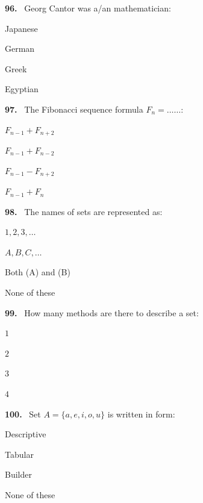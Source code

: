 \documentclass[11pt]{article}
\newenvironment{qenv}[1]{%
  \par\medskip\noindent\textbf{#1.}\ \ignorespaces
}{\par}
\begin{document}
\begin{qenv}{96} Georg Cantor was a/an \underline{\hspace{2cm}} mathematician:
\begin{options} \item Japanese \item German \item Greek \item Egyptian \end{options} \end{qenv}

\begin{qenv}{97} The Fibonacci sequence formula $F_n = \ldots\ldots$:
\begin{options} \item $F_{n-1}+F_{n+2}$ \item $F_{n-1}+F_{n-2}$ \item $F_{n-1}-F_{n+2}$ \item $F_{n-1}+F_{n}$ \end{options} \end{qenv}

\begin{qenv}{98} The names of sets are represented as:
\begin{options} \item $1,2,3,\ldots$ \item $A,B,C,\ldots$ \item Both (A) and (B) \item None of these \end{options} \end{qenv}




\begin{qenv}{99} How many methods are there to describe a set:
\begin{options} \item $1$ \item $2$ \item $3$ \item $4$ \end{options} \end{qenv}

\begin{qenv}{100} Set $A=\{a,e,i,o,u\}$ is written in \underline{\hspace{2cm}} form:
\begin{options} \item Descriptive \item Tabular \item Builder \item None of these \end{options} \end{qenv}
\end{document}
